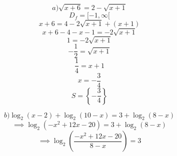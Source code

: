\documentclass{article}
\begin{document}
\[a) \sqrt{x+6} = 2 - \sqrt{x+1}\]
\[D_f = [-1, \infty[\]
\[ x+6 = 4 - 2\sqrt{x+1} + (x+1) \]
\[ x+6 - 4 - x - 1 = -2\sqrt{x+1} \]
\[ 1 = -2\sqrt{x+1} \]
\[ -\frac{1}{2} = \sqrt{x+1} \]
\[ \frac{1}{4} = x+1 \]
\[ x = -\frac{3}{4} \]
\[ S = \left\{-\frac{3}{4}\right\} \]

\[b) \log_2(x-2) + \log_2(10-x) = 3 + \log_2(8-x)\]
\[ \implies \log_2(-x^2+12x-20) = 3 + \log_2(8-x) \]
\[ \implies \log_2\left(\frac{-x^2+12x-20}{8-x}\right) = 3 \]
\end{document}
